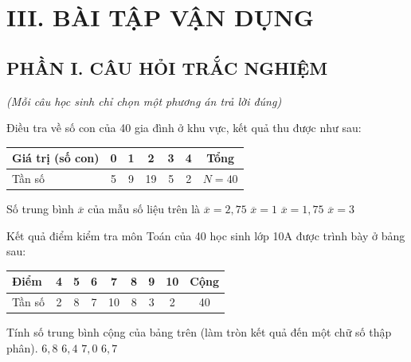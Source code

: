\vspace{0.4cm}
\section*{III. BÀI TẬP VẬN DỤNG}

\subsection*{PHẦN I. CÂU HỎI TRẮC NGHIỆM}
\textit{\small (Mỗi câu học sinh chỉ chọn một phương án trả lời đúng)}
\setcounter{ex}{0}

\begin{ex}
	Điều tra về số con của 40 gia đình ở khu vực, kết quả thu được như sau:
	\begin{center}
	\begin{tabular}{|l|c|c|c|c|c|c|}
		\hline
		Giá trị (số con) & 0 & 1 & 2 & 3 & 4 & Tổng \\
		\hline
		Tần số & 5 & 9 & 19 & 5 & 2 & $N = 40$ \\
		\hline
	\end{tabular}
	\end{center}
	Số trung bình $\overline{x}$ của mẫu số liệu trên là
	\choice
	{$\overline{x} = 2{,}75$}
	{$\overline{x} = 1$}
	{\True $\overline{x} = 1{,}75$}
	{$\overline{x} = 3$}
\end{ex}

\begin{ex}
	Kết quả điểm kiểm tra môn Toán của 40 học sinh lớp 10A được trình bày ở bảng sau:
	\begin{center}
	\begin{tabular}{|l|c|c|c|c|c|c|c|c|}
		\hline
		Điểm & 4 & 5 & 6 & 7 & 8 & 9 & 10 & Cộng \\
		\hline
		Tần số & 2 & 8 & 7 & 10 & 8 & 3 & 2 & 40 \\
		\hline
	\end{tabular}
	\end{center}
	Tính số trung bình cộng của bảng trên (làm tròn kết quả đến một chữ số thập phân).
	\choice
	{\True $6{,}8$}
	{$6{,}4$}
	{$7{,}0$}
	{$6{,}7$}
\end{ex}

